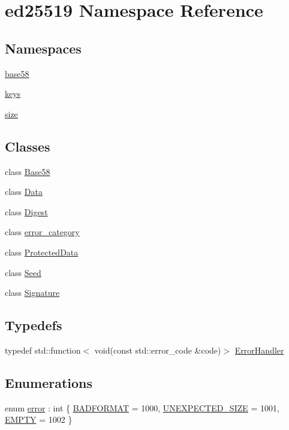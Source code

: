 \hypertarget{namespaceed25519}{}\section{ed25519 Namespace Reference}
\label{namespaceed25519}
\subsection*{Namespaces}
\begin{DoxyCompactItemize}
\item 
 \mbox{\hyperlink{namespaceed25519_1_1base58}{base58}}
\item 
 \mbox{\hyperlink{namespaceed25519_1_1keys}{keys}}
\item 
 \mbox{\hyperlink{namespaceed25519_1_1size}{size}}
\end{DoxyCompactItemize}
\subsection*{Classes}
\begin{DoxyCompactItemize}
\item 
class \mbox{\hyperlink{classed25519_1_1_base58}{Base58}}
\item 
class \mbox{\hyperlink{classed25519_1_1_data}{Data}}
\item 
class \mbox{\hyperlink{classed25519_1_1_digest}{Digest}}
\item 
class \mbox{\hyperlink{classed25519_1_1error__category}{error\+\_\+category}}
\item 
class \mbox{\hyperlink{classed25519_1_1_protected_data}{Protected\+Data}}
\item 
class \mbox{\hyperlink{classed25519_1_1_seed}{Seed}}
\item 
class \mbox{\hyperlink{classed25519_1_1_signature}{Signature}}
\end{DoxyCompactItemize}
\subsection*{Typedefs}
\begin{DoxyCompactItemize}
\item 
typedef std\+::function$<$ void(const std\+::error\+\_\+code \&code)$>$ \mbox{\hyperlink{namespaceed25519_a6ba572942b3c18591fc869d52a6b16e6}{Error\+Handler}}
\end{DoxyCompactItemize}
\subsection*{Enumerations}
\begin{DoxyCompactItemize}
\item 
enum \mbox{\hyperlink{namespaceed25519_ac93d0b5156eaca22197055e902920bc4}{error}} \+: int \{ \mbox{\hyperlink{namespaceed25519_ac93d0b5156eaca22197055e902920bc4a28729b5efcbf8605d4412dbb86c3963b}{B\+A\+D\+F\+O\+R\+M\+AT}} = 1000, 
\mbox{\hyperlink{namespaceed25519_ac93d0b5156eaca22197055e902920bc4a4a6895889f9590d64f64599b968a48b0}{U\+N\+E\+X\+P\+E\+C\+T\+E\+D\+\_\+\+S\+I\+ZE}} = 1001, 
\mbox{\hyperlink{namespaceed25519_ac93d0b5156eaca22197055e902920bc4ad16a8ea865652b7e7222111ab6f7ea36}{E\+M\+P\+TY}} = 1002
 \}
\end{DoxyCompactItemize}
